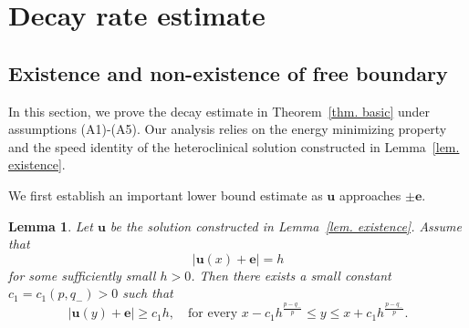 \documentclass[11pt,twoside,reqno]{amsart}
\newcounter{assu}
\newtheorem{lemma}{Lemma}[section]
\numberwithin{equation}{section}
\begin{document}
\section{Decay rate estimate}
\subsection{Existence and non-existence of free boundary}
In this section, we prove the decay estimate in Theorem~\ref{thm. basic} under assumptions (A1)-(A5). Our analysis relies on the energy minimizing property and the speed identity of the heteroclinical solution constructed in Lemma~\ref{lem. existence}.

We first establish an important lower bound estimate as $\mathbf{u}$ approaches $\pm\mathbf{e}$.
\begin{lemma}\label{lem. lower bound of decay}
    Let $\mathbf{u}$ be the solution constructed in Lemma~\ref{lem. existence}. Assume that 
    \[
        |\mathbf{u}(x)+\mathbf{e}|=h
    \]
    for some sufficiently small $h>0$. Then there exists a small constant
    $c_{1}=c_{1}(p,q_{-})>0$ such that
    \begin{equation*}
        |\mathbf{u}(y)+\mathbf{e}|\geq c_{1}h,\quad\mbox{for every }x-c_{1}h^{\frac{p-q_{-}}{p}}\leq y\leq x+c_{1}h^{\frac{p-q_{-}}{p}}.
    \end{equation*}
\end{lemma}
\end{document}
